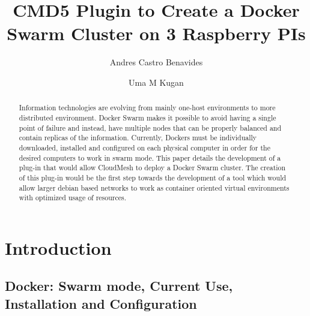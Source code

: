
\title{CMD5 Plugin to Create a Docker Swarm Cluster on 3 Raspberry PIs}
	
%
%

	\author{Andres Castro Benavides}
	
	\author{Uma M Kugan}
	\renewcommand{\shortauthors}{Uma Kugan, Andres Castro}
  
\begin{abstract}
  Information technologies are evolving from mainly one-host
  environments to more distributed environment. Docker Swarm makes it
  possible to avoid having a single point of failure and instead, have
  multiple nodes that can be properly balanced and contain replicas of
  the information. Currently, Dockers must be individually downloaded,
  installed and configured on each physical computer in order for the
  desired computers to work in swarm mode. This paper details the
  development of a plug-in that would allow CloudMesh to deploy a
  Docker Swarm cluster.  The creation of this plug-in would be the
  first step towards the development of a tool which would allow
  larger debian based networks to work as container oriented virtual
  environments with optimized usage of resources.
\end{abstract}
	
	
\maketitle
	
\section{Introduction}
	
\subsection{Docker: Swarm mode, Current Use, Installation and
  Configuration}

